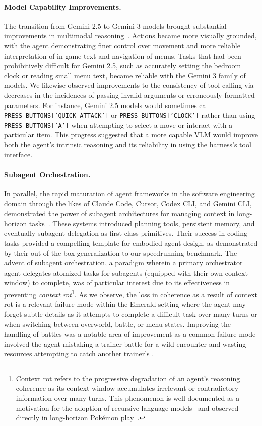 \paragraph{Model Capability Improvements.} The transition from Gemini 2.5 to Gemini 3 models brought substantial improvements in multimodal reasoning~\citep{google2025gemini3}. Actions became more visually grounded, with the agent demonstrating finer control over movement and more reliable interpretation of in-game text and navigation of menus. Tasks that had been prohibitively difficult for Gemini 2.5, such as accurately setting the bedroom clock or reading small menu text, became reliable with the Gemini 3 family of models. We likewise observed improvements to the consistency of tool-calling via decreases in the incidences of  passing invalid arguments or erroneously formatted parameters. For instance, Gemini 2.5 models would sometimes call \texttt{PRESS\_BUTTONS['QUICK ATTACK']} or \texttt{PRESS\_BUTTONS['CLOCK']} rather than using \texttt{PRESS\_BUTTONS['A']} when attempting to select a move or interact with a particular item. This progress suggested that a more capable VLM would improve both the agent's intrinsic reasoning and its reliability in using the harness's tool interface.


\paragraph{Subagent Orchestration.} In parallel, the rapid maturation of agent frameworks in the software engineering domain through the likes of Claude Code, Cursor, Codex CLI, and Gemini CLI, demonstrated the power of subagent architectures for managing context in long-horizon tasks~\citep{cursor2026scalingagents}. These systems introduced planning tools, persistent memory, and eventually subagent delegation as first-class primitives. Their success in coding tasks provided a compelling template for embodied agent design, as demonstrated by their out-of-the-box generalization to our speedrunning benchmark. The advent of subagent orchestration, a paradigm wherein a primary orchestrator agent delegates atomized tasks for subagents (equipped with their own context window) to complete, was of particular interest due to its effectiveness in preventing \textit{context rot}\footnote{Context rot refers to the progressive degradation of an agent's reasoning coherence as its context window accumulates irrelevant or contradictory information over many turns. This phenomenon is well documented as a motivation for the adoption of recursive language models~\citep{zhang2025rlm} and observed directly in long-horizon Pok\'{e}mon play~\citep{gemini2p5report}.}. As we observe, the loss in coherence as a result of context rot is a relevant failure mode within the \pokemon{} Emerald setting where the agent may forget subtle details as it attempts to complete a difficult task over many turns or when switching between overworld, battle, or menu states. Improving the handling of battles was a notable area of improvement as a common failure mode involved the agent mistaking a trainer battle for a wild encounter and wasting resources attempting to catch another trainer's \pokemon{}.

